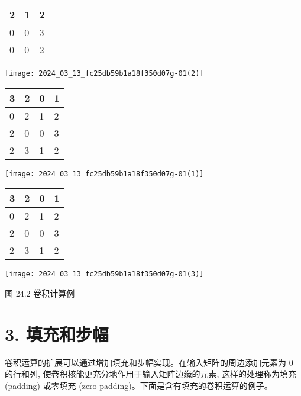 \documentclass[10pt]{article}
\begin{document}
\begin{center}
\begin{tabular}{|l|l|l|}
\hline
2 & 1 & 2 \\
\hline
0 & 0 & 3 \\
\hline
0 & 0 & 2 \\
\hline
\end{tabular}
\end{center}

\begin{center}
\texttt{[image: 2024\_03\_13\_fc25db59b1a18f350d07g-01(2)]}
\end{center}

\begin{center}
\begin{tabular}{|l|l|l|l|}
\hline
3 & 2 & 0 & 1 \\
\hline
0 & 2 & 1 & 2 \\
\hline
2 & 0 & 0 & 3 \\
\hline
2 & 3 & 1 & 2 \\
\hline
\end{tabular}
\end{center}

\begin{center}
\texttt{[image: 2024\_03\_13\_fc25db59b1a18f350d07g-01(1)]}
\end{center}

\begin{center}
\begin{tabular}{|l|l|l|l|}
\hline
3 & 2 & 0 & 1 \\
\hline
0 & 2 & 1 & 2 \\
\hline
2 & 0 & 0 & 3 \\
\hline
2 & 3 & 1 & 2 \\
\hline
\end{tabular}
\end{center}

\begin{center}
\texttt{[image: 2024\_03\_13\_fc25db59b1a18f350d07g-01(3)]}
\end{center}

图 24.2 卷积计算例

\section*{3. 填充和步幅}
卷积运算的扩展可以通过增加填充和步幅实现。在输入矩阵的周边添加元素为 0 的行和列, 使卷积核能更充分地作用于输入矩阵边缘的元素, 这样的处理称为填充 (padding) 或零填充 (zero padding)。下面是含有填充的卷积运算的例子。
\end{document}
